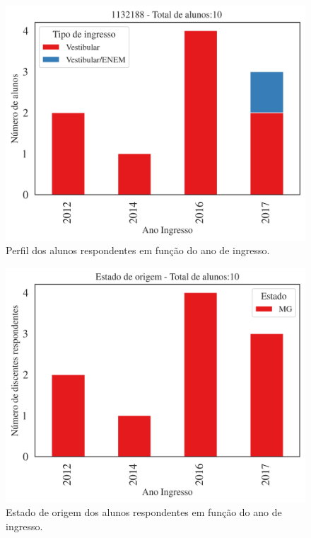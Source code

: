 \documentclass[a4paper,10pt]{article}
\begin{document}
\begin{figure}[h]
\centering
\includegraphics[width=0.99\linewidth]{ingresso_discentes_curso_tipo_1132188}
\caption{\label{fig:ingressoano} Perfil  dos alunos respondentes  em função do ano de ingresso.}
\end{figure}

\begin{figure}[h]
\centering
\includegraphics[width=0.99\linewidth]{quantitativos_estado_de_origem_1132188}
\caption{\label{fig:estadoano} Estado de origem dos alunos respondentes em função do ano de ingresso.}
\end{figure}
\end{document}
